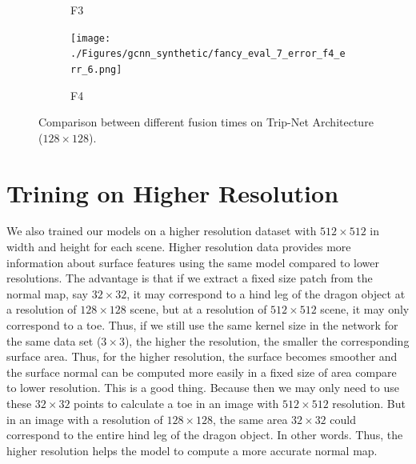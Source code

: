 \begin{figure}
\begin{subfigure}[b]{0.18\linewidth}
		\caption{F3}
	\end{subfigure}
	\begin{subfigure}[b]{0.18\linewidth}
		\texttt{[image: ./Figures/gcnn\_synthetic/fancy\_eval\_7\_error\_f4\_err\_6.png]}
		\caption{F4}
	\end{subfigure}
	\decoRule
	\caption{Comparison between different fusion times on Trip-Net Architecture ($ 128\times128 $). }
	\label{fig:tripnet-fusion-eval}
\end{figure}




\section{Trining on Higher Resolution}
We also trained our models on a higher resolution dataset with $ 512 \times 512 $ in width and height for each scene. Higher resolution data provides more information about surface features using the same model compared to lower resolutions. The advantage is that if we extract a fixed size patch from the normal map, say $32\times32$, it may correspond to a hind leg of the dragon object at a resolution of $128 \times 128$ scene, but at a resolution of $512\times 512$ scene, it may only correspond to a toe. Thus, if we still use the same kernel size in the network for the same data set ($ 3\times 3 $), the higher the resolution, the smaller the corresponding surface area. 
Thus, for the higher resolution, the surface becomes smoother and the surface normal can be computed more easily in a fixed size of area compare to lower resolution. This is a good thing. Because then we may only need to use these $ 32\times 32 $ points to calculate a toe in an image with $ 512\times512 $ resolution. But in an image with a resolution of $ 128\times128 $, the same area $ 32\times32 $ could correspond to the entire hind leg of the dragon object. In other words. Thus, the higher resolution helps the model to compute a more accurate normal map. 


